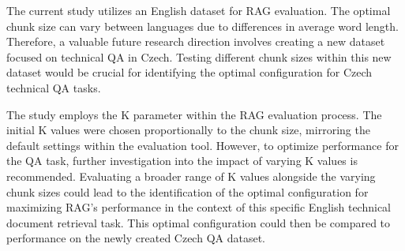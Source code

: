 The current study utilizes an English dataset for \ac{RAG} evaluation.
The optimal chunk size can vary between languages due to differences in average word length.
Therefore, a valuable future research direction involves creating a new dataset focused on technical \ac{QA} in Czech.
Testing different chunk sizes within this new dataset would be crucial for identifying the optimal configuration for Czech technical \ac{QA} tasks.

The study employs the K parameter within the \ac{RAG} evaluation process.
The initial K values were chosen proportionally to the chunk size, mirroring the default settings within the evaluation tool.
However, to optimize performance for the \ac{QA} task, further investigation into the impact of varying K values is recommended.
Evaluating a broader range of K values alongside the varying chunk sizes could lead to the identification of the optimal configuration for maximizing \ac{RAG}'s performance in the context of this specific English technical document retrieval task.
This optimal configuration could then be compared to performance on the newly created Czech \ac{QA} dataset.




